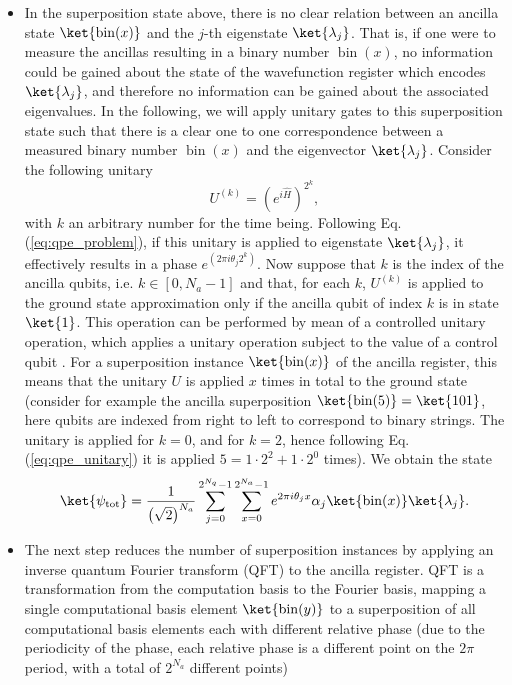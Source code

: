 \begin{itemize}
    \item In the superposition state above, there is no clear relation between an ancilla state $\ket{\operatorname{bin}(x)}$ and the $j$-th eigenstate $\ket{\lambda_j}$. That is, if one were to measure the ancillas resulting in a binary number $\operatorname{bin}(x)$, no information could be gained about the state of the wavefunction register which encodes $\ket{\lambda_j}$, and therefore no information can be gained about the associated eigenvalues. In the following, we will apply unitary gates to this superposition state such that there is a clear one to one correspondence between a measured binary number $\operatorname{bin}(x)$ and the eigenvector $\ket{\lambda_j}$. Consider the following unitary
    \begin{equation} \label{eq:qpe_unitary}
        U^{(k)} = \left(e^{i\hat{H}}\right)^{2^k},
    \end{equation}
    with $k$ an arbitrary number for the time being. Following Eq. (\ref{eq:qpe_problem}), if this unitary is applied to eigenstate $\ket{\lambda_j}$, it effectively results in a phase $e^{(2\pi i\theta_j 2^k)}$. Now suppose that $k$ is the index of the ancilla qubits, i.e. $k \in [0, N_a - 1]$ and that, for each $k$, $U^{(k)}$ is applied to the ground state approximation only if the ancilla qubit of index $k$ is in state $\ket{1}$. This operation can be performed by mean of a controlled unitary operation, which applies a unitary operation subject to the value of a control qubit \cite{nielsenQuantumComputationQuantum2010}. For a superposition instance $\ket{\operatorname{bin}(x)}$ of the ancilla register, this means that the unitary $U$ is applied $x$ times in total to the ground state (consider for example the ancilla superposition $\ket{\operatorname{bin}(5)} = \ket{101}$, here qubits are indexed from right to left to correspond to binary strings. The unitary is applied for $k = 0$, and for $k = 2$, hence following Eq. (\ref{eq:qpe_unitary}) it is applied $5 = 1 \cdot 2^2 + 1 \cdot 2^0$ times). We obtain the state
    \begin{equation} \label{eq:qpe_post_CU}
        \ket{\psi_{\mathrm{tot}}} = \frac{1}{\left(\sqrt{2}\right)^{N_a}} \sum_{j=0}^{2^{N_q}-1} \sum_{x=0}^{2^{N_a} - 1} e^{2\pi i \theta_j x} \alpha_j \ket{\operatorname{bin}(x)} \ket{\lambda_j}.
    \end{equation}
    \item The next step reduces the number of superposition instances by applying an inverse quantum Fourier transform (QFT) to the ancilla register. QFT is a transformation from the computation basis to the Fourier basis, mapping a single computational basis element $\ket{\operatorname{bin}(y)}$ to a superposition of all computational basis elements each with different relative phase (due to the periodicity of the phase, each relative phase is a different point on the $2\pi$ period, with a total of $2^{N_a}$ different points)

\end{itemize}
